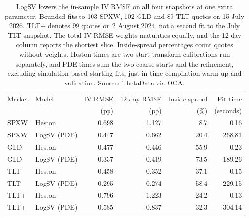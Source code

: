 \begin{table}[htbp]\centering\small
\begin{tabular}{@{}l l r r r r@{}}\toprule
Market & Model & IV RMSE & 12-day RMSE & Inside spread & Fit time\\
 & & (pp) & (pp) & (\%) & (seconds)\\\midrule

SPXW & Heston & 0.698 & 1.127 & 8.7 & 0.16 \\

SPXW & LogSV (PDE) & 0.447 & 0.662 & 20.4 & 268.81 \\

GLD & Heston & 0.477 & 0.446 & 55.9 & 0.23 \\

GLD & LogSV (PDE) & 0.337 & 0.419 & 73.5 & 189.26 \\

TLT & Heston & 0.458 & 0.352 & 37.1 & 0.15 \\

TLT & LogSV (PDE) & 0.295 & 0.274 & 58.4 & 229.15 \\

TLT+ & Heston & 0.796 & 1.223 & 24.2 & 0.13 \\

TLT+ & LogSV (PDE) & 0.585 & 0.837 & 32.3 & 304.14 \\

\bottomrule\end{tabular}
\caption{LogSV lowers the in-sample IV RMSE on all four snapshots at one extra
parameter. Bounded fits to 103 SPXW, 102 GLD and 89 TLT quotes on 15 July 2026.
TLT+ denotes 99 quotes on 2 August 2024, not a second fit to the July TLT snapshot.
The total IV RMSE weights maturities equally, and the 12-day column reports the
shortest slice. Inside-spread percentages count quotes without weights. Heston
times are two-start transform calibrations run separately, and PDE times sum the two coarse
starts and the refinement, excluding simulation-based starting fits, just-in-time compilation warm-up
and validation. Source: ThetaData
via OCA.}
\label{tab:oca-fits}\end{table}

